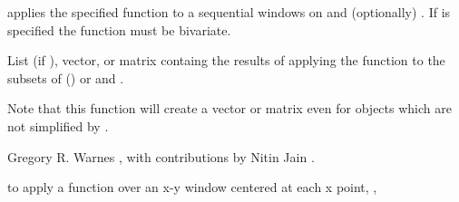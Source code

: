 \begin{Details}\relax
{} applies the specified function to
a sequential windows on  and (optionally) .  If
 is specified the function must be bivariate.
\end{Details}
\begin{Value}
List (if ), vector, or matrix containg the
results of applying the function  to the
subsets of  () or  and .

Note that this function will create a vector or matrix even for
objects which are not simplified by .
\end{Value}
\begin{Author}\relax
Gregory R. Warnes ,
with contributions by Nitin Jain .
\end{Author}
\begin{SeeAlso}\relax
{} to apply a function over an x-y window
centered at each x point, ,
\end{SeeAlso}

